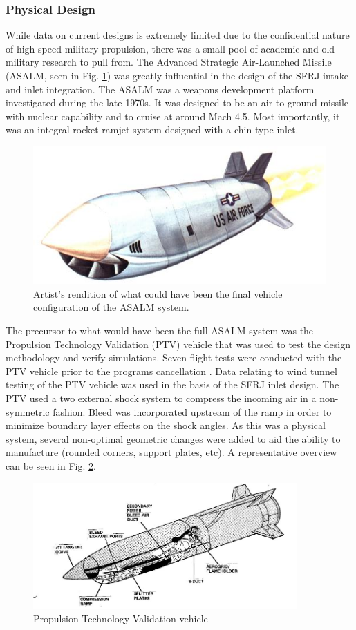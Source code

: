 \subsubsection{Physical Design}
 While data on current designs is extremely limited due to the confidential nature of high-speed military propulsion, there was a small pool of academic and old military research to pull from. The Advanced Strategic Air-Launched Missile (ASALM, seen in Fig. \ref{fig:ASALM}) was greatly influential in the design of the SFRJ intake and inlet integration. The ASALM was a weapons development platform investigated during the late 1970s. It was designed to be an air-to-ground missile with nuclear capability and to cruise at around Mach 4.5. Most importantly, it was an integral rocket-ramjet system designed with a chin type inlet.
 
\begin{figure}[H]
\centering
\includegraphics[width=.5\textwidth]{JWE_Figures/asalm.jpg}
\caption{Artist's rendition of what could have been the final vehicle configuration of the ASALM system. \cite{parsch}}
\label{fig:ASALM}
\end{figure}
 
The precursor to what would have been the full ASALM system was the Propulsion Technology Validation (PTV) vehicle that was used to test the design methodology and verify simulations. Seven flight tests were conducted with the PTV vehicle prior to the programs cancellation \cite{parsch}. Data relating to wind tunnel testing of the PTV vehicle was used in the basis of the SFRJ inlet design. The PTV used a two external shock system to compress the incoming air in a non-symmetric fashion. Bleed was incorporated upstream of the ramp in order to minimize boundary layer effects on the shock angles. As this was a physical system, several non-optimal geometric changes were added to aid the ability to manufacture (rounded corners, support plates, etc). A representative overview can be seen in Fig. \ref{fig:ASALM_Intern}.

\begin{figure}[H]
\centering
\includegraphics[width=0.9\textwidth]{JWE_Figures/ASALM_Internal.jpg}
\caption{Propulsion Technology Validation vehicle  \cite{webster_bucy_1979}}
\label{fig:ASALM_Intern}
\end{figure}


